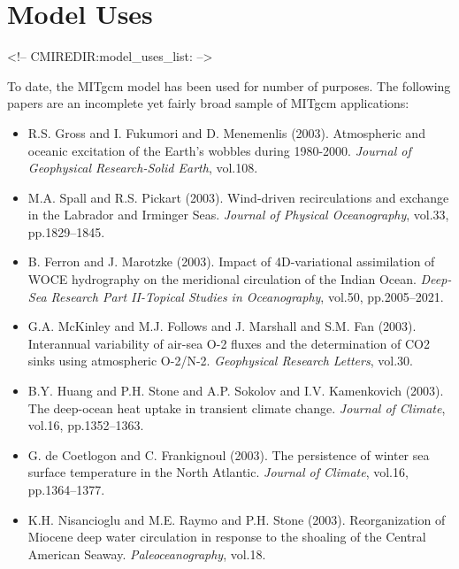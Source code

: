
\chapter{Model Uses}
\begin{rawhtml}
<!-- CMIREDIR:model_uses_list: -->
\end{rawhtml}



To date, the MITgcm model has been used for number of purposes.  The
following papers are an incomplete yet fairly broad sample of MITgcm
applications:

\begin{itemize}

\item R.S. Gross and I. Fukumori and D. Menemenlis (2003).
Atmospheric and oceanic excitation of the Earth's wobbles during 1980-2000.
{\it Journal of Geophysical Research-Solid Earth}, vol.108.

\item M.A. Spall and R.S. Pickart (2003).
Wind-driven recirculations and exchange in the Labrador and Irminger Seas. 
{\it Journal of Physical Oceanography}, vol.33, pp.1829--1845. 

\item B. Ferron and J. Marotzke (2003).
Impact of 4D-variational assimilation of WOCE hydrography on the
meridional circulation of the Indian Ocean. {\it Deep-Sea Research Part
II-Topical Studies in Oceanography}, vol.50, pp.2005--2021.

\item G.A. McKinley and M.J. Follows and J. Marshall and S.M. Fan (2003).
Interannual variability of air-sea O-2 fluxes and the determination of
CO2 sinks using atmospheric O-2/N-2. {\it Geophysical Research Letters},
vol.30. 

\item B.Y. Huang and P.H. Stone and A.P. Sokolov and I.V. Kamenkovich
(2003). The deep-ocean heat uptake in transient climate change. {\it Journal
of Climate}, vol.16, pp.1352--1363. 

\item G. de Coetlogon and C. Frankignoul (2003). The persistence of winter
sea surface temperature in the North Atlantic. {\it Journal of Climate},
vol.16, pp.1364--1377. 

\item K.H. Nisancioglu and M.E. Raymo and P.H. Stone (2003).
Reorganization of Miocene deep water circulation in response to the
shoaling of the Central American Seaway. {\it Paleoceanography}, vol.18. 


\end{itemize}
